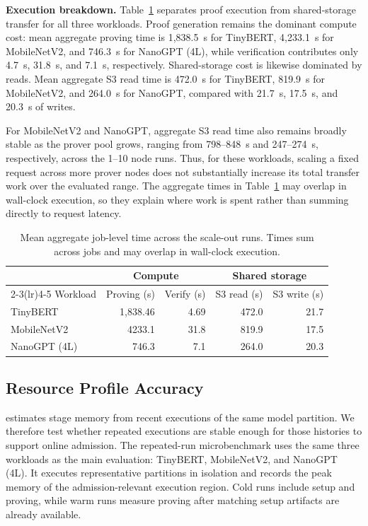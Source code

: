 \textbf{Execution breakdown.}
Table~\ref{tab:scaleout-overhead} separates proof execution from shared-storage transfer for all three workloads. Proof generation remains the dominant compute cost: mean aggregate proving time is 1{,}838.5~s for TinyBERT, 4{,}233.1~s for MobileNetV2, and 746.3~s for NanoGPT (4L), while verification contributes only 4.7~s, 31.8~s, and 7.1~s, respectively. Shared-storage cost is likewise dominated by reads. Mean aggregate S3 read time is 472.0~s for TinyBERT, 819.9~s for MobileNetV2, and 264.0~s for NanoGPT, compared with 21.7~s, 17.5~s, and 20.3~s of writes.

For MobileNetV2 and NanoGPT, aggregate S3 read time also remains broadly stable as the prover pool grows, ranging from 798--848~s and 247--274~s, respectively, across the 1--10 node runs. Thus, for these workloads, scaling a fixed request across more prover nodes does not substantially increase its total transfer work over the evaluated range. The aggregate times in Table~\ref{tab:scaleout-overhead} may overlap in wall-clock execution, so they explain where work is spent rather than summing directly to request latency.

\begin{table}[t]
\centering
\small
\setlength{\tabcolsep}{3pt}
\renewcommand{\arraystretch}{1.06}
\begin{tabular*}{\columnwidth}{@{\extracolsep{\fill}}lrrrr@{}}
\toprule
& \multicolumn{2}{c}{Compute} & \multicolumn{2}{c}{Shared storage} \\
\cmidrule(lr){2-3}\cmidrule(lr){4-5}
Workload & Proving (s) & Verify (s) & S3 read (s) & S3 write (s) \\
\midrule
TinyBERT & 1,838.46  & 4.69 & 472.0 & 21.7 \\
MobileNetV2  & 4233.1 & 31.8 & 819.9 & 17.5 \\
NanoGPT (4L) & 746.3  & 7.1  & 264.0 & 20.3 \\
\bottomrule
\end{tabular*}
\caption{Mean aggregate job-level time across the scale-out runs. Times sum across jobs and may overlap in wall-clock execution.}
\label{tab:scaleout-overhead}
\end{table}

\subsection{Resource Profile Accuracy}
\label{sec:profile-accuracy}

\TITLE{} estimates stage memory from recent executions of the same model partition. We therefore test whether repeated executions are stable enough for those histories to support online admission. The repeated-run microbenchmark uses the same three workloads as the main evaluation: TinyBERT, MobileNetV2, and NanoGPT (4L). It executes representative partitions in isolation and records the peak memory of the admission-relevant execution region. Cold runs include setup and proving, while warm runs measure proving after matching setup artifacts are already available.

